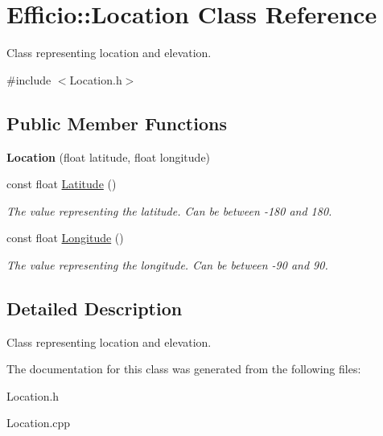 \hypertarget{class_efficio_1_1_location}{}\section{Efficio\+:\+:Location Class Reference}
\label{class_efficio_1_1_location}


Class representing location and elevation.  




{\ttfamily \#include $<$Location.\+h$>$}

\subsection*{Public Member Functions}
\begin{DoxyCompactItemize}
\item 
{\bfseries Location} (float latitude, float longitude)\hypertarget{class_efficio_1_1_location_ade7f56683b0df64f19b601fb6f8b4eef}{}\label{class_efficio_1_1_location_ade7f56683b0df64f19b601fb6f8b4eef}

\item 
const float \hyperlink{class_efficio_1_1_location_a0c453ced18a3d2383dead546e52a9c0b}{Latitude} ()\hypertarget{class_efficio_1_1_location_a0c453ced18a3d2383dead546e52a9c0b}{}\label{class_efficio_1_1_location_a0c453ced18a3d2383dead546e52a9c0b}

\begin{DoxyCompactList}\small\item\em The value representing the latitude. Can be between -\/180 and 180. \end{DoxyCompactList}\item 
const float \hyperlink{class_efficio_1_1_location_ae56fd66c31fe7b510844827695c0f9bc}{Longitude} ()\hypertarget{class_efficio_1_1_location_ae56fd66c31fe7b510844827695c0f9bc}{}\label{class_efficio_1_1_location_ae56fd66c31fe7b510844827695c0f9bc}

\begin{DoxyCompactList}\small\item\em The value representing the longitude. Can be between -\/90 and 90. \end{DoxyCompactList}\end{DoxyCompactItemize}


\subsection{Detailed Description}
Class representing location and elevation. 

The documentation for this class was generated from the following files\+:\begin{DoxyCompactItemize}
\item 
Location.\+h\item 
Location.\+cpp\end{DoxyCompactItemize}
